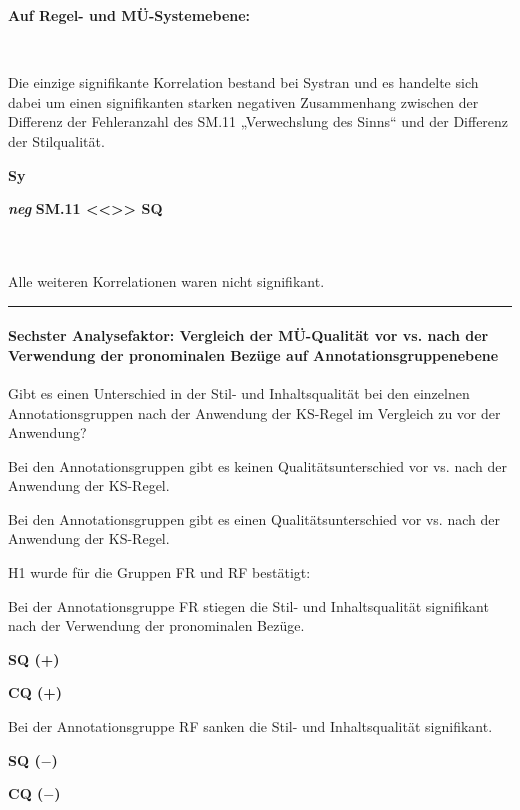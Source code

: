 \noindent
\parbox[t]{.7\textwidth}{\textbf{Auf Regel- und MÜ-Systemebene:}}\\
\parbox[t]{.7\textwidth}{
Die einzige signifikante Korrelation bestand bei Systran und es handelte sich dabei um einen signifikanten starken negativen Zusammenhang zwischen der Differenz der Fehleranzahl des SM.11 „Verwechslung des Sinns“ und der Differenz der Stilqualität.
}
\parbox[t]{.04\textwidth}{}
\colorbox{smGreen}{\parbox[t]{.25\textwidth}{
{ \textbf{Sy}}

 \textbf{\textit{neg} }\textbf{SM.11 <{}<{}>{}> SQ}\\
 \\
 \\
}}

\medskip
\noindent
\parbox[t]{.7\textwidth}{Alle weiteren Korrelationen waren nicht signifikant.}

\hrule
\paragraph*{Sechster Analysefaktor: Vergleich der MÜ-Qualität vor vs. nach der Verwendung der pronominalen Bezüge auf Annotationsgruppenebene}
\begin{description}[font=\normalfont\bfseries]
\item [Fragestellung:] Gibt es einen Unterschied in der Stil- und Inhaltsqualität bei den einzelnen Annotationsgruppen nach der Anwendung der KS-Regel im Vergleich zu vor der Anwendung?
\item [H0 --] Bei den Annotationsgruppen gibt es keinen Qualitätsunterschied vor vs. nach der Anwendung der KS-Regel.
\item [H1 --] Bei den Annotationsgruppen gibt es einen Qualitätsunterschied vor vs. nach der Anwendung der KS-Regel.
\item [Resultat]
\end{description}
\noindent
\parbox[t]{.8\textwidth}{
H1 wurde für die Gruppen FR und RF bestätigt:

Bei der Annotationsgruppe FR stiegen die Stil- und Inhaltsqualität signifikant nach der Verwendung der pronominalen Bezüge.
}
\parbox[t]{.04\textwidth}{}
\colorbox{smGreen}{\parbox[t]{.15\textwidth}{
{ \textbf{SQ (+)}}

 \textbf{CQ (+)}\\
}}

\medskip
\noindent
\parbox[t]{.8\textwidth}{
Bei der Annotationsgruppe RF sanken die Stil- und Inhaltsqualität signifikant.
}
\parbox[t]{.04\textwidth}{}
\colorbox{smGreen}{\parbox[t]{.15\textwidth}{
{ \textbf{SQ ($-$)}}

 \textbf{CQ ($-$)}
}}

